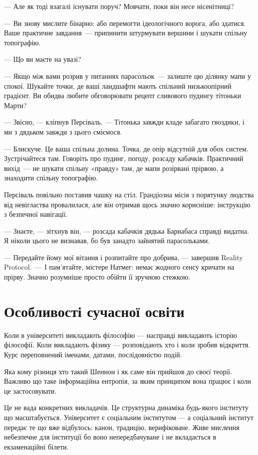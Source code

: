 \documentclass[12pt, a4paper, openany]{book}
\begin{document}
\begin{realitybox}
--- Але як тоді взагалі існувати поруч? Мовчати, поки він несе нісенітниці?

--- Ви знову мислите бінарно: або перемогти ідеологічного ворога, або здатися. Ваше практичне завдання~--- припинити штурмувати вершини і шукати спільну топографію.

--- Що ви маєте на увазі?

--- Якщо між вами розрив у питаннях парасольок~--- залиште цю ділянку мапи у спокої. Шукайте точки, де ваші ландшафти мають спільний низькоопірний градієнт. Ви обидва любите обговорювати рецепт сливового пудингу тітоньки Марти?

--- Звісно, --- кліпнув Персіваль. --- Тітонька завжди кладе забагато гвоздики, і ми з дядьком завжди з цього сміємося.

--- Блискуче. Це ваша спільна долина. Точка, де опір відсутній для обох систем. Зустрічайтеся там. Говоріть про пудинг, погоду, розсаду кабачків. Практичний вихід~--- не шукати спільну «правду» там, де мапи розірвані прірвою, а знаходити спільну топографію.

\medskip
Персіваль повільно поставив чашку на стіл. Грандіозна місія з порятунку людства від невігластва провалилася, але він отримав щось значно корисніше: інструкцію з безпечної навігації.

--- Знаєте, --- зітхнув він, --- розсада кабачків дядька Барнабаса справді видатна. Я ніколи цього не визнавав, бо був занадто зайнятий парасольками.

--- Передайте йому мої вітання і розпитайте про добрива, --- завершив Reality Protocol.~--- І пам'ятайте, містере Натмег: немає жодного сенсу кричати на прірву. Значно розумніше просто обійти її зручною стежкою.
\end{realitybox}

\chapter{Особливості сучасної освіти}

Коли в університеті викладають філософію --- насправді викладають історію філософії. Коли викладають фізику --- розповідають хто і коли зробив відкриття. Курс переповнений іменами, датами, послідовністю подій.

Яка кому різниця хто такий Шеннон і як саме він прийшов до своєї теорії. Важливо що таке інформаційна ентропія, за яким принципом вона працює і коли це застосовувати.

Це не вада конкретних викладачів. Це структурна динаміка будь-якого інституту що масштабується. Університет є соціальним інститутом --- а соціальний інститут передає те що вже відбулось: канон, традицію, верифіковане. Живе мислення небезпечне для інституції бо воно непередбачуване і не вкладається в екзаменаційні білети.
\end{document}
